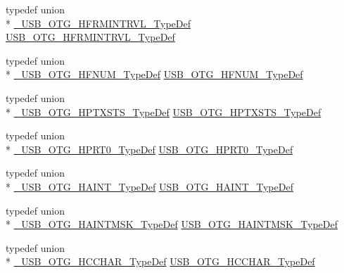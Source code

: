 \begin{DoxyCompactItemize}
typedef union \\*
\hyperlink{union___u_s_b___o_t_g___h_f_r_m_i_n_t_r_v_l___type_def}{\-\_\-\-U\-S\-B\-\_\-\-O\-T\-G\-\_\-\-H\-F\-R\-M\-I\-N\-T\-R\-V\-L\-\_\-\-Type\-Def} \hyperlink{group______otg___core__registers_ga1b918d11326957608988e1608f8f5b9a}{U\-S\-B\-\_\-\-O\-T\-G\-\_\-\-H\-F\-R\-M\-I\-N\-T\-R\-V\-L\-\_\-\-Type\-Def}
\item 
typedef union \\*
\hyperlink{union___u_s_b___o_t_g___h_f_n_u_m___type_def}{\-\_\-\-U\-S\-B\-\_\-\-O\-T\-G\-\_\-\-H\-F\-N\-U\-M\-\_\-\-Type\-Def} \hyperlink{group______otg___core__registers_gaf7f2a4af41c0a170d73bf0ded9281f6c}{U\-S\-B\-\_\-\-O\-T\-G\-\_\-\-H\-F\-N\-U\-M\-\_\-\-Type\-Def}
\item 
typedef union \\*
\hyperlink{union___u_s_b___o_t_g___h_p_t_x_s_t_s___type_def}{\-\_\-\-U\-S\-B\-\_\-\-O\-T\-G\-\_\-\-H\-P\-T\-X\-S\-T\-S\-\_\-\-Type\-Def} \hyperlink{group______otg___core__registers_ga8035ded48c116160e780b4de7518b3a5}{U\-S\-B\-\_\-\-O\-T\-G\-\_\-\-H\-P\-T\-X\-S\-T\-S\-\_\-\-Type\-Def}
\item 
typedef union \\*
\hyperlink{union___u_s_b___o_t_g___h_p_r_t0___type_def}{\-\_\-\-U\-S\-B\-\_\-\-O\-T\-G\-\_\-\-H\-P\-R\-T0\-\_\-\-Type\-Def} \hyperlink{group______otg___core__registers_gaf388d811fc9aa002a6a07acc0f69691d}{U\-S\-B\-\_\-\-O\-T\-G\-\_\-\-H\-P\-R\-T0\-\_\-\-Type\-Def}
\item 
typedef union \\*
\hyperlink{union___u_s_b___o_t_g___h_a_i_n_t___type_def}{\-\_\-\-U\-S\-B\-\_\-\-O\-T\-G\-\_\-\-H\-A\-I\-N\-T\-\_\-\-Type\-Def} \hyperlink{group______otg___core__registers_gad8c735d777a4358d46ea793c4398d700}{U\-S\-B\-\_\-\-O\-T\-G\-\_\-\-H\-A\-I\-N\-T\-\_\-\-Type\-Def}
\item 
typedef union \\*
\hyperlink{union___u_s_b___o_t_g___h_a_i_n_t_m_s_k___type_def}{\-\_\-\-U\-S\-B\-\_\-\-O\-T\-G\-\_\-\-H\-A\-I\-N\-T\-M\-S\-K\-\_\-\-Type\-Def} \hyperlink{group______otg___core__registers_gafa4fc8f89590fb0d2fcee7c021de65b0}{U\-S\-B\-\_\-\-O\-T\-G\-\_\-\-H\-A\-I\-N\-T\-M\-S\-K\-\_\-\-Type\-Def}
\item 
typedef union \\*
\hyperlink{union___u_s_b___o_t_g___h_c_c_h_a_r___type_def}{\-\_\-\-U\-S\-B\-\_\-\-O\-T\-G\-\_\-\-H\-C\-C\-H\-A\-R\-\_\-\-Type\-Def} \hyperlink{group______otg___core__registers_ga03b68f3d9839fa57f547a990cfcb7c8b}{U\-S\-B\-\_\-\-O\-T\-G\-\_\-\-H\-C\-C\-H\-A\-R\-\_\-\-Type\-Def}

\end{DoxyCompactItemize}

